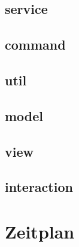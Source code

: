 \documentclass[18pt]{beamer}
\begin{document}
	\subsection{service}
		
	\subsection{command}
		
	\subsection{util}
		
	\subsection{model}
		
		
	\subsection{view}
		
	\subsection{interaction}
		

\section{Zeitplan}

\appendix
\beginbackup
\backupend
\end{document}
